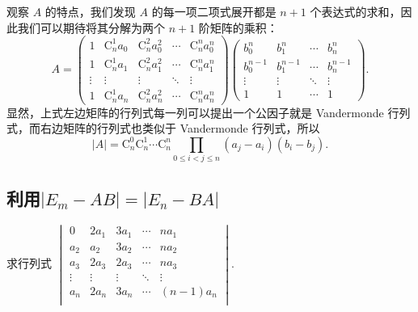 \begin{solution}
    观察 $A$ 的特点，我们发现 $A$ 的每一项二项式展开都是 $n + 1$ 个表达式的求和，因此我们可以期待将其分解为两个 $n + 1$ 阶矩阵的乘积：
    \[ A = \begin{pmatrix}
        1 & \text{C}_n^1 a_0 & \text{C}_n^2 a_0^2 & \cdots & \text{C}_n^n a_0^n \\
        1 & \text{C}_n^1 a_1 & \text{C}_n^2 a_1^2 & \cdots & \text{C}_n^n a_1^n \\
        \vdots & \vdots & \vdots & \ddots & \vdots \\
        1 & \text{C}_n^1 a_n & \text{C}_n^2 a_n^2 & \cdots & \text{C}_n^n a_n^n
    \end{pmatrix} \begin{pmatrix}
        b_0^n & b_1^n & \cdots & b_n^n \\
        b_0^{n - 1} & b_1^{n - 1} & \cdots & b_n^{n - 1} \\
        \vdots & \vdots & \ddots & \vdots \\
        1 & 1 & \cdots & 1
    \end{pmatrix}. \]
    显然，上式左边矩阵的行列式每一列可以提出一个公因子就是 Vandermonde 行列式，而右边矩阵的行列式也类似于 Vandermonde 行列式，所以
    \[ |A| = \text{C}_n^0 \text{C}_n^1 \cdots \text{C}_n^n \prod\limits_{0 \leqslant i < j \leqslant n}(a_j - a_i)(b_i - b_j). \]
\end{solution}

\subsection{利用$|E_m-AB|=|E_n-BA|$} \label{sec:利用|E_m-AB|=|E_n-BA|}

\begin{example}{}{}
    求行列式 $\begin{vmatrix}
            0      & 2a_1   & 3a_1   & \cdots & na_1     \\
            a_2    & a_2    & 3a_2   & \cdots & na_2     \\
            a_3    & 2a_3   & 2a_3   & \cdots & na_3     \\
            \vdots & \vdots & \vdots & \ddots & \vdots   \\
            a_n    & 2a_n   & 3a_n   & \cdots & (n-1)a_n \\
        \end{vmatrix}$.
\end{example}

